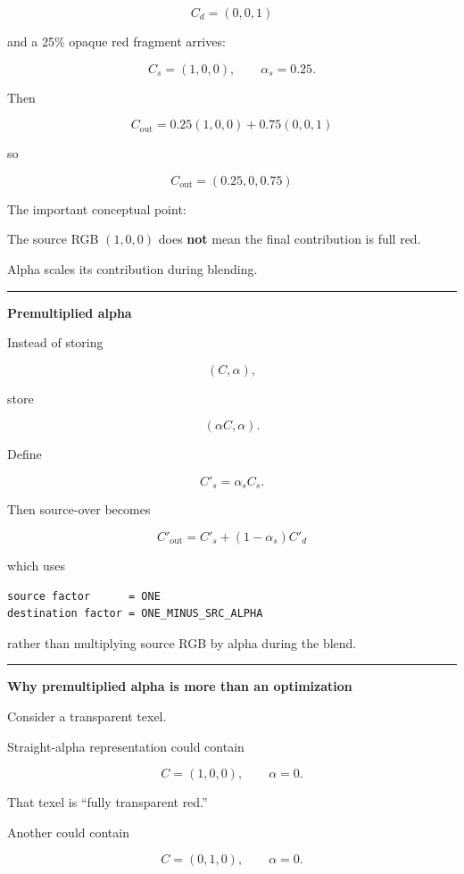 \[
C_d=(0,0,1)
\]

and a 25\% opaque red fragment arrives:

\[
C_s=(1,0,0),\qquad \alpha_s=0.25.
\]

Then

\[
C_{\text{out}}
=
0.25(1,0,0)
+
0.75(0,0,1)
\]

so

\[
\boxed{
C_{\text{out}}
=
(0.25,0,0.75)
}
\]

The important conceptual point:

The source RGB \((1,0,0)\) does \textbf{not} mean the final contribution is full red.

Alpha scales its contribution during blending.

\begin{center}\rule{0.5\linewidth}{0.5pt}\end{center}

\textbf{Premultiplied alpha}

Instead of storing

\[
(C,\alpha),
\]

store

\[
(\alpha C,\alpha).
\]

Define

\[
C'_s=\alpha_s C_s.
\]

Then source-over becomes

\[
\boxed{
C'_{\text{out}}
=
C'_s+(1-\alpha_s)C'_d
}
\]

which uses

\begin{verbatim}
source factor      = ONE
destination factor = ONE_MINUS_SRC_ALPHA
\end{verbatim}

rather than multiplying source RGB by alpha during the blend.

\begin{center}\rule{0.5\linewidth}{0.5pt}\end{center}

\textbf{Why premultiplied alpha is more than an optimization}

Consider a transparent texel.

Straight-alpha representation could contain

\[
C=(1,0,0),\qquad \alpha=0.
\]

That texel is ``fully transparent red.''

Another could contain

\[
C=(0,1,0),\qquad \alpha=0.
\]

